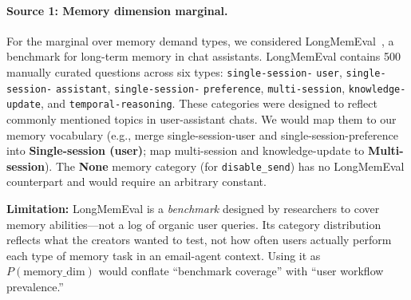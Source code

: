 
\paragraph{Source 1: Memory dimension marginal.}
For the marginal over memory demand types, we considered LongMemEval~\citep{wu2024longmemeval}, a benchmark for long-term memory in chat assistants. LongMemEval contains 500 manually curated questions across six types: \texttt{single-session-} \texttt{user}, \texttt{single-session-}{ \texttt{assistant}}, \texttt{single-session-}{ \texttt{preference}}, \texttt{multi-session}, \texttt{knowledge-update}, and \texttt{temporal-reasoning}. These categories were designed to reflect commonly mentioned topics in user-assistant chats. We would map them to our memory vocabulary (e.g., merge single-session-user and single-session-preference into \textbf{Single-session (user)}; map multi-session and knowledge-update to \textbf{Multi-session}). The \textbf{None} memory category (for \texttt{disable\_send}) has no LongMemEval counterpart and would require an arbitrary constant.

\textbf{Limitation:} LongMemEval is a \emph{benchmark} designed by researchers to cover memory abilities---not a log of organic user queries. Its category distribution reflects what the creators wanted to test, not how often users actually perform each type of memory task in an email-agent context. Using it as $P(\text{memory\_dim})$ would conflate ``benchmark coverage'' with ``user workflow prevalence.''

